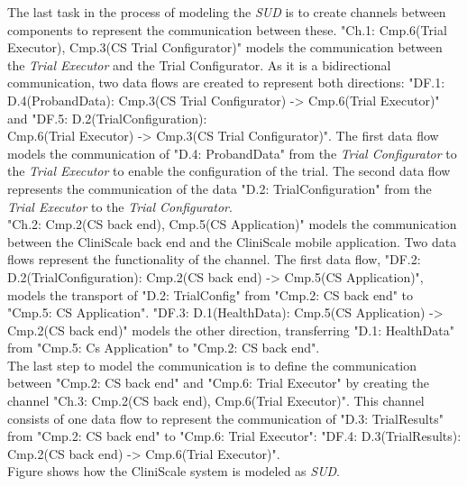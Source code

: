 The last task in the process of modeling the \textit{SUD} is to create channels between components to represent the communication between these. "Ch.1: Cmp.6(Trial Executor), Cmp.3(CS Trial Configurator)" models the communication between the \textit{Trial Executor} and the Trial Configurator. As it is a bidirectional communication, two data flows are created to represent both directions: "DF.1: D.4(ProbandData): Cmp.3(CS Trial Configurator) -> Cmp.6(Trial Executor)" and "DF.5: D.2(TrialConfiguration): \\Cmp.6(Trial Executor) -> Cmp.3(CS Trial Configurator)". The first data flow models the communication of "D.4: ProbandData" from the \textit{Trial Configurator} to the \textit{Trial Executor} to enable the configuration of the trial. The second data flow represents the communication of the data "D.2: TrialConfiguration" from the \textit{Trial Executor} to the \textit{Trial Configurator}.\\
\newline
"Ch.2: Cmp.2(CS back end), Cmp.5(CS Application)" models the communication between the CliniScale back end and the CliniScale mobile application. Two data flows represent the functionality of the channel. The first data flow, "DF.2: \\D.2(TrialConfiguration): Cmp.2(CS back end) -> Cmp.5(CS Application)", models the transport of "D.2: TrialConfig" from "Cmp.2: CS back end" to "Cmp.5: CS Application". "DF.3: D.1(HealthData): Cmp.5(CS Application) -> Cmp.2(CS back end)" models the other direction, transferring "D.1: HealthData" from "Cmp.5: Cs Application" to "Cmp.2: CS back end".\\
\newline
The last step to model the communication is to define the communication between "Cmp.2: CS back end" and "Cmp.6: Trial Executor" by creating the channel "Ch.3: Cmp.2(CS back end), Cmp.6(Trial Executor)". This channel consists of one data flow to represent the communication of "D.3: TrialResults" from "Cmp.2: CS back end" to "Cmp.6: Trial Executor": "DF.4: D.3(TrialResults): Cmp.2(CS back end) -> Cmp.6(Trial Executor)".\\
\newline
Figure  shows how the CliniScale system is modeled as \textit{SUD}.
